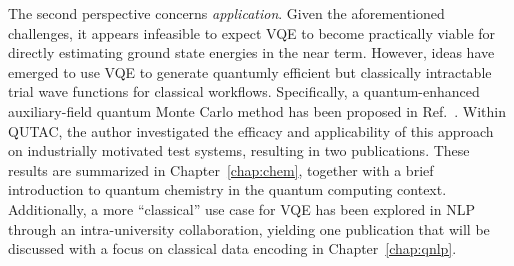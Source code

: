 \documentclass[../main.tex]{subfiles}
\begin{document}
The second perspective concerns \textit{application}. Given the aforementioned challenges, it appears infeasible to expect \ac{VQE} to become practically viable for directly estimating ground state energies in the near term. However, ideas have emerged to use \ac{VQE} to generate quantumly efficient but classically intractable trial wave functions for classical workflows. Specifically, a quantum-enhanced auxiliary-field quantum Monte Carlo method has been proposed in Ref.~\cite{huggins2022unbiasing}. Within \ac{QUTAC}, the author investigated the efficacy and applicability of this approach on industrially motivated test systems, resulting in two publications. These results are summarized in Chapter~\ref{chap:chem}, together with a brief introduction to quantum chemistry in the quantum computing context. Additionally, a more ``classical'' use case for \ac{VQE} has been explored in \ac{NLP} through an intra-university collaboration, yielding one publication that will be discussed with a focus on classical data encoding in Chapter~\ref{chap:qnlp}.
\end{document}
